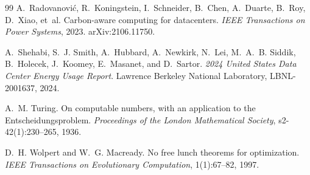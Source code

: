 \documentclass[11pt]{article}
\theoremstyle{definition}
\theoremstyle{remark}
\begin{document}
\begin{thebibliography}{99}
A.~Radovanovi\'c, R.~Koningstein, I.~Schneider, B.~Chen, A.~Duarte, B.~Roy, D.~Xiao, et~al.
\newblock Carbon-aware computing for datacenters.
\newblock \emph{IEEE Transactions on Power Systems}, 2023. arXiv:2106.11750.

A.~Shehabi, S.~J. Smith, A.~Hubbard, A.~Newkirk, N.~Lei, M.~A.~B. Siddik, B.~Holecek, J.~Koomey, E.~Masanet, and D.~Sartor.
\newblock \emph{2024 United States Data Center Energy Usage Report}.
\newblock Lawrence Berkeley National Laboratory, LBNL-2001637, 2024.

A.~M. Turing.
\newblock On computable numbers, with an application to the Entscheidungsproblem.
\newblock \emph{Proceedings of the London Mathematical Society}, s2-42(1):230--265, 1936.

D.~H. Wolpert and W.~G. Macready.
\newblock No free lunch theorems for optimization.
\newblock \emph{IEEE Transactions on Evolutionary Computation}, 1(1):67--82, 1997.

\end{thebibliography}
\end{document}
